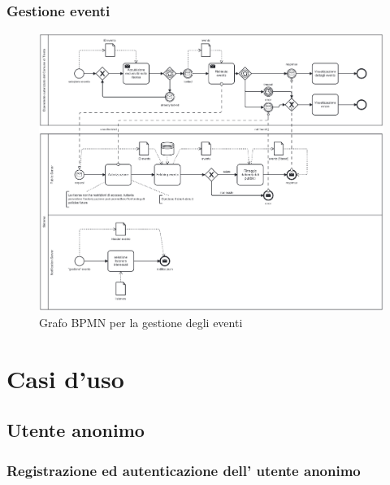 \documentclass{article}
\begin{document}
\subsubsection{Gestione eventi}

\begin{figure}[htbp]
    \label{7.2.3}
    \centering
    \includegraphics[width=1\textwidth]{Images/BPMN - gestione_evento.png}
    \caption{Grafo BPMN per la gestione degli eventi}
\end{figure}

\clearpage

\section{Casi d'uso}

\subsection{Utente anonimo}

\subsubsection{Registrazione ed autenticazione dell' utente anonimo}
\end{document}
